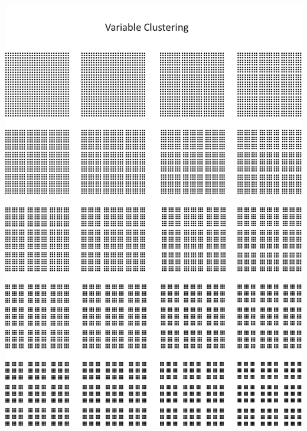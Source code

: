 \documentclass[
  12pt,
  a4paper, twoside]{book}
\begin{document}
\begin{center}\includegraphics[width=1\linewidth]{Appendix/clustering} \end{center}

\newpage
\end{document}
